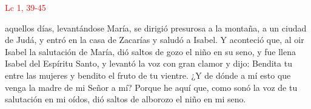 \hfill\textcolor{red}{Lc 1, 39-45}

 aquellos días, levantándose María, se dirigió presurosa a la montaña, a un ciudad de Judá, y entró en la casa de Zacarías y saludó a Isabel.
Y aconteció que, al oir Isabel la salutación de María, dió saltos de gozo el niño en su seno, y fue llena Isabel del Espíritu Santo, y levantó la voz con gran clamor y dijo:
Bendita tu entre las mujeres y bendito el fruto de tu vientre. ¿Y de dónde a mí esto que venga la madre de mi Señor a mí? Porque he aquí que, como sonó la voz de tu salutación en mi oídos,
dió saltos de alborozo el niño en mi seno.